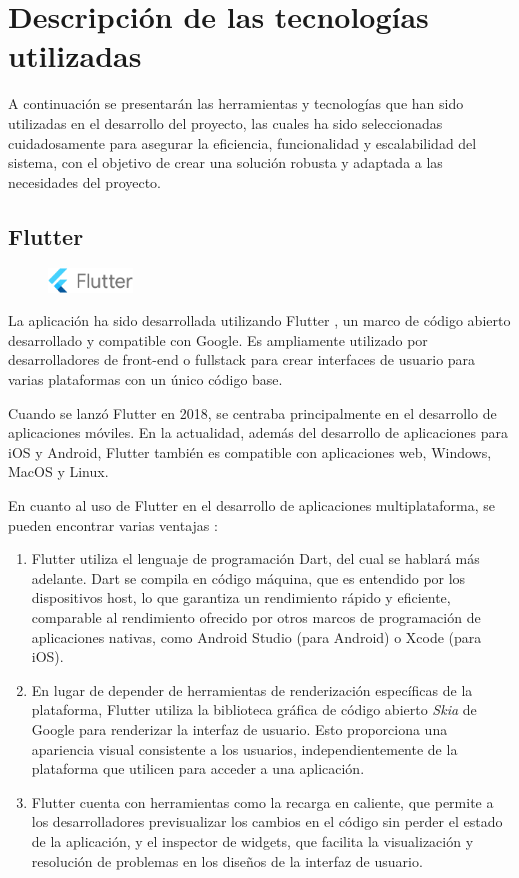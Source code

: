 \documentclass{article}
\begin{document}
\section{Descripción de las tecnologías utilizadas}

A continuación se presentarán las herramientas y tecnologías que han sido utilizadas en el desarrollo del proyecto, las cuales ha sido seleccionadas cuidadosamente para asegurar la eficiencia, funcionalidad y escalabilidad del sistema, con el objetivo de crear una solución robusta y adaptada a las necesidades del proyecto.

\subsection{Flutter}

\begin{figure}[h]
    \centering
    \includegraphics[width=0.2\textwidth]{imagenes/logos/logo_flutter.png}
\end{figure}

La aplicación ha sido desarrollada utilizando Flutter \cite{Flutter}, un marco de código abierto desarrollado y compatible con Google. Es ampliamente utilizado por desarrolladores de front-end o fullstack para crear interfaces de usuario para varias plataformas con un único código base.

Cuando se lanzó Flutter en 2018, se centraba principalmente en el desarrollo de aplicaciones móviles. En la actualidad, además del desarrollo de aplicaciones para iOS y Android, Flutter también es compatible con aplicaciones web, Windows, MacOS y Linux.

En cuanto al uso de Flutter en el desarrollo de aplicaciones multiplataforma, se pueden encontrar varias ventajas \cite{Flutter 1}:

\begin{enumerate}
    \item Flutter utiliza el lenguaje de programación Dart, del cual se hablará más adelante. Dart se compila en código máquina, que es entendido por los dispositivos host, lo que garantiza un rendimiento rápido y eficiente, comparable al rendimiento ofrecido por otros marcos de programación de aplicaciones nativas, como Android Studio (para Android) o Xcode (para iOS).
    \item En lugar de depender de herramientas de renderización específicas de la plataforma, Flutter utiliza la biblioteca gráfica de código abierto \textit{Skia} de Google para renderizar la interfaz de usuario. Esto proporciona una apariencia visual consistente a los usuarios, independientemente de la plataforma que utilicen para acceder a una aplicación.
    \item Flutter cuenta con herramientas como la recarga en caliente, que permite a los desarrolladores previsualizar los cambios en el código sin perder el estado de la aplicación, y el inspector de widgets, que facilita la visualización y resolución de problemas en los diseños de la interfaz de usuario.
\end{enumerate}
\end{document}
